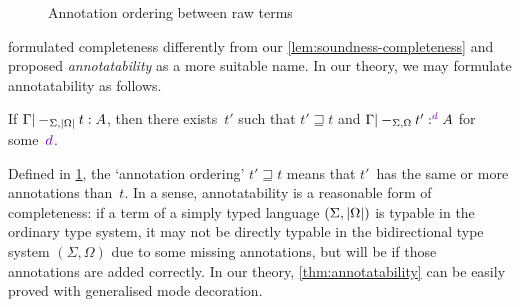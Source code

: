 \begin{figure}
  \centering\small
  
  \caption{Annotation ordering between raw terms}
  \label{fig:annotation-ordering}
\end{figure}

\citet[Section~3.2]{Dunfield2021} formulated completeness differently from our \cref{lem:soundness-completeness} and proposed \emph{annotatability} as a more suitable name.
In our theory, we may formulate annotatability as follows.

\begin{proposition}[Annotatability]\label{thm:annotatability}
If\/ $\Gamma |-_{\Sigma,\left|\Omega\right|} t : A$, then there exists~$t'$ such that\/ $t' \sqsupseteq t$ and $\Gamma |-_{\Sigma,\Omega} t' :^\dir{d} A$ for some~$\dir{d}$.
\end{proposition}

Defined in \cref{fig:annotation-ordering}, the `annotation ordering' $t' \sqsupseteq t$ means that $t'$~has the same or more annotations than~$t$.
In a sense, annotatability is a reasonable form of completeness: if a term of a simply typed language $(\Sigma, \left|\Omega\right|)$ is typable in the ordinary type system, it may not be directly typable in the bidirectional type system $(\Sigma, \Omega)$ due to some missing annotations, but will be if those annotations are added correctly.
In our theory, \cref{thm:annotatability} can be easily proved with generalised mode decoration.


